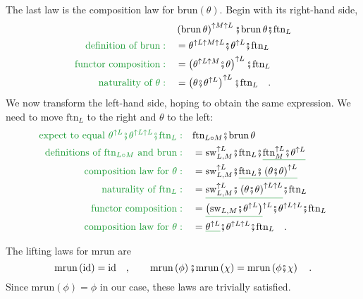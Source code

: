 The last law is the composition law for $\text{brun}\left(\theta\right)$.
Begin with its right-hand side,
\begin{align*}
 & \left(\text{brun}\,\theta\right)^{\uparrow M\uparrow L}\bef\text{brun}\,\theta\bef\text{ftn}_{L}\\
{\color{greenunder}\text{definition of }\text{brun}:}\quad & =\theta^{\uparrow L\uparrow M\uparrow L}\bef\theta^{\uparrow L}\bef\text{ftn}_{L}\\
{\color{greenunder}\text{functor composition}:}\quad & =\left(\theta^{\uparrow L\uparrow M}\bef\theta\right)^{\uparrow L}\bef\text{ftn}_{L}\\
{\color{greenunder}\text{naturality of }\theta:}\quad & =\left(\theta\bef\theta^{\uparrow L}\right)^{\uparrow L}\bef\text{ftn}_{L}\quad.
\end{align*}
We now transform the left-hand side, hoping to obtain the same expression.
We need to move $\text{ftn}_{L}$ to the right and $\theta$ to the
left: 
\begin{align*}
{\color{greenunder}\text{expect to equal }\theta^{\uparrow L}\bef\theta^{\uparrow L\uparrow L}\bef\text{ftn}_{L}:}\quad & \text{ftn}_{L\circ M}\bef\text{brun}\,\theta\\
{\color{greenunder}\text{definitions of }\text{ftn}_{L\circ M}\text{ and }\text{brun}:}\quad & =\text{sw}_{L,M}^{\uparrow L}\bef\text{ftn}_{L}\bef\gunderline{\text{ftn}_{M}^{\uparrow L}\bef\theta^{\uparrow L}}\\
{\color{greenunder}\text{composition law for }\theta:}\quad & =\text{sw}_{L,M}^{\uparrow L}\bef\gunderline{\text{ftn}_{L}\bef\left(\theta\bef\theta\right)^{\uparrow L}}\\
{\color{greenunder}\text{naturality of }\text{ftn}_{L}:}\quad & =\gunderline{\text{sw}_{L,M}^{\uparrow L}\bef\left(\theta\bef\theta\right)^{\uparrow L\uparrow L}}\bef\text{ftn}_{L}\\
{\color{greenunder}\text{functor composition}:}\quad & =\gunderline{\left(\text{sw}_{L,M}\bef\theta^{\uparrow L}\right)}^{\uparrow L}\bef\theta^{\uparrow L\uparrow L}\bef\text{ftn}_{L}\\
{\color{greenunder}\text{composition law for }\theta:}\quad & =\gunderline{\theta^{\uparrow L}}\bef\theta^{\uparrow L\uparrow L}\bef\text{ftn}_{L}\quad.
\end{align*}

The lifting laws for $\text{mrun}$ are
\[
\text{mrun}\left(\text{id}\right)=\text{id}\quad,\quad\quad\text{mrun}\left(\phi\right)\bef\text{mrun}\left(\chi\right)=\text{mrun}\left(\phi\bef\chi\right)\quad.
\]
Since $\text{mrun}\left(\phi\right)=\phi$ in our case, these laws
are trivially satisfied.

